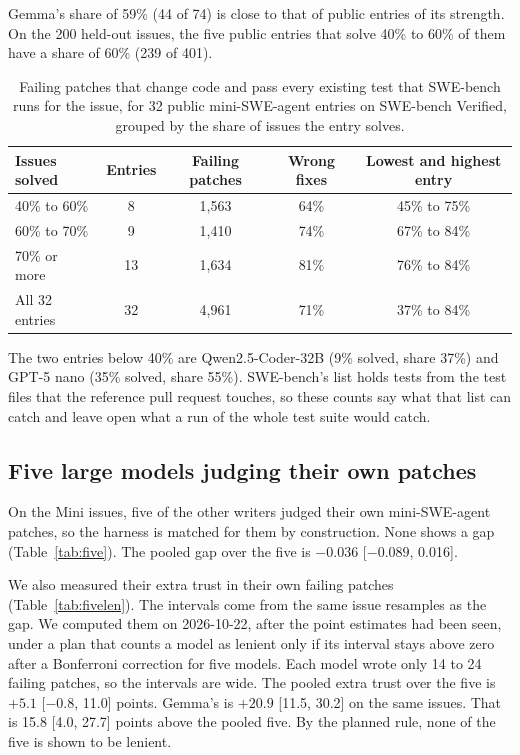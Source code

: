 \documentclass[10pt,letterpaper]{article}
\begin{document}
Gemma's share of 59\% (44 of 74) is close to that of public entries of its strength. On the 200 held-out issues, the
five public entries that solve 40\% to 60\% of them have a share of 60\% (239 of 401).

\begin{table}[H]
\centering
\small
\caption{Failing patches that change code and pass every existing test that SWE-bench runs for the issue, for 32
public mini-SWE-agent entries on SWE-bench Verified, grouped by the share of issues the entry solves.}
\label{tab:census}
\begin{tabular}{@{}lcccc@{}}
\toprule
Issues solved & Entries & Failing patches & Wrong fixes & Lowest and highest entry \\
\midrule
40\% to 60\% & 8 & 1,563 & 64\% & 45\% to 75\% \\
60\% to 70\% & 9 & 1,410 & 74\% & 67\% to 84\% \\
70\% or more & 13 & 1,634 & 81\% & 76\% to 84\% \\
\midrule
All 32 entries & 32 & 4,961 & 71\% & 37\% to 84\% \\
\bottomrule
\end{tabular}
\end{table}

The two entries below 40\% are Qwen2.5-Coder-32B (9\% solved, share 37\%) and GPT-5 nano (35\% solved, share 55\%).
SWE-bench's list holds tests from the test files that the reference pull request touches, so these counts say what
that list can catch and leave open what a run of the whole test suite would catch.

\subsection*{Five large models judging their own patches}

On the Mini issues, five of the other writers judged their own mini-SWE-agent patches, so the harness is matched for
them by construction. None shows a gap (Table~\ref{tab:five}). The pooled gap over the five is $-0.036$ [$-0.089$,
0.016].

We also measured their extra trust in their own failing patches (Table~\ref{tab:fivelen}). The intervals come from the %
same issue resamples as the gap. We computed them on 2026-10-22, after the point estimates had been seen, under a
plan that counts a model as lenient only if its interval stays above zero after a Bonferroni correction for five
models. Each model wrote only 14 to 24 failing patches, so the intervals are wide. The pooled extra trust
over the five is $+5.1$ [$-0.8$, 11.0] points. Gemma's is $+20.9$ [11.5, 30.2] on the same issues. That is 15.8 [4.0, 27.7]
points above the pooled five. By the planned rule, none of the five is shown to be lenient.
\end{document}
